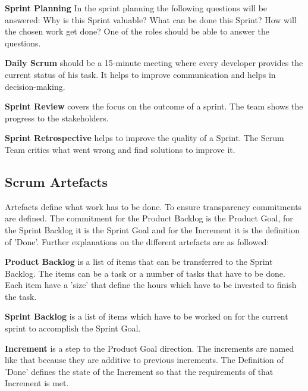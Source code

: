 \textbf{Sprint Planning} In the sprint planning the following questions will be answered: Why is this Sprint valuable? What can be done this Sprint? How will the chosen work get done? One of the roles should be able to answer the questions. \cite{scrum_guide}

\textbf{Daily Scrum} should be a 15-minute meeting where every developer provides the current status of his task. It helps to improve communication and helps in decision-making. \cite{scrum_guide}

\textbf{Sprint Review} covers the focus on the outcome of a sprint. The team shows the progress to the stakeholders. \cite{scrum_guide}

\textbf{Sprint Retrospective} helps to improve the quality of a Sprint. The Scrum Team critics what went wrong and find solutions to improve it. \cite{scrum_guide}

\subsection{Scrum Artefacts} \label{sec:Scrum Artefacts}

Artefacts define what work has to be done. To ensure transparency commitments are defined. The commitment for the Product Backlog is the Product Goal, for the Sprint Backlog it is the Sprint Goal and for the Increment it is the definition of 'Done'. Further explanations on the different artefacts are as followed: \cite{scrum_guide}

\textbf{Product Backlog} is a list of items that can be transferred to the Sprint Backlog. The items can be a task or a number of tasks that have to be done. Each item have a 'size' that define the hours which have to be invested to finish the task. \cite{scrum_guide}

\textbf{Sprint Backlog} is a list of items which have to be worked on for the current sprint to accomplish the Sprint Goal. \cite{scrum_guide}

\textbf{Increment} is a step to the Product Goal direction. The increments are named like that because they are additive to previous increments. The Definition of 'Done' defines the state of the Increment so that the requirements of that Increment is met. \cite{scrum_guide}
